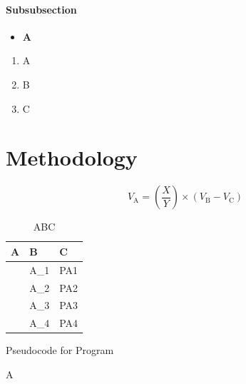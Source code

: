 \documentclass{ecsthesis}       %
\begin{document}
\subsubsection{Subsubsection}\label{subsubsection}

\begin{itemize}
\item
  \textbf{A}
\end{itemize}

\begin{enumerate}
\def\labelenumi{\arabic{enumi}.}
\item
  A
\item
  B
\item
  C
\end{enumerate}



\chapter{Methodology}\label{methodology}

\begin{equation}
  V_{\text{A}} = \left(\frac{X}{Y}\right) \times (V_{\text{B}} - V_{\text{C}})
  \label{VoutZoom}
\end{equation}

\begin{table}[!htb]
  \centering
  \begin{tabular}{p{2.5cm} p{6cm} p{2.5cm}}
    \toprule
    \textbf{A} & \textbf{B} & \textbf{C} \\
    \midrule
    & A\_1 & PA1 \\
    & A\_2 & PA2 \\
    & A\_3 & PA3 \\
    & A\_4 & PA4 \\
    \bottomrule
  \end{tabular}
  \caption{ABC}
  \label{tab:abc}
\end{table}

\begin{algorithm}[!htb]
	\caption{Pseudocode for Program}
	\begin{algorithmic}[1] %
		\STATE A
	\end{algorithmic}
\end{algorithm}

\end{document}

